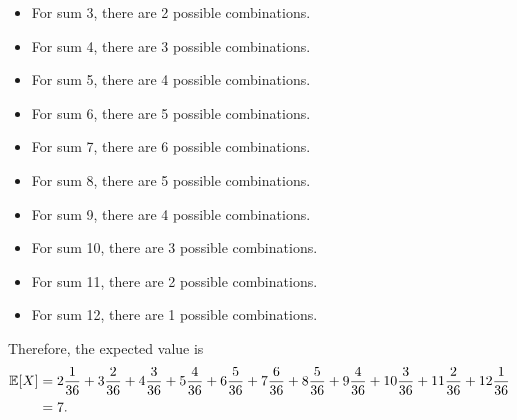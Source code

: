\documentclass[letterpaper]{article}
\newcommand{\0}{\mathbf{0}}
\begin{document}
\begin{mdframed}
\begin{enumerate}
\begin{mdframed}
\begin{itemize}
                \item For sum 3, there are 2 possible combinations.
                \item For sum 4, there are 3 possible combinations.  
                \item For sum 5, there are 4 possible combinations. 
                \item For sum 6, there are 5 possible combinations. 
                \item For sum 7, there are 6 possible combinations. 
                \item For sum 8, there are 5 possible combinations. 
                \item For sum 9, there are 4 possible combinations. 
                \item For sum 10, there are 3 possible combinations. 
                \item For sum 11, there are 2 possible combinations. 
                \item For sum 12, there are 1 possible combinations. 
            \end{itemize}
            Therefore, the expected value is 
            \begin{equation*}
                \begin{aligned}
                    \mathbb{E}[X] &= 2 \frac{1}{36} + 3 \frac{2}{36} + 4 \frac{3}{36} + 5 \frac{4}{36} + 6 \frac{5}{36} + 7 \frac{6}{36} + 8 \frac{5}{36} + 9 \frac{4}{36} + 10 \frac{3}{36} + 11 \frac{2}{36} + 12 \frac{1}{36} \\ 
                        &= 7.
                \end{aligned}
            \end{equation*}
        \end{mdframed}
    \end{enumerate}
\end{mdframed}
\end{document}
